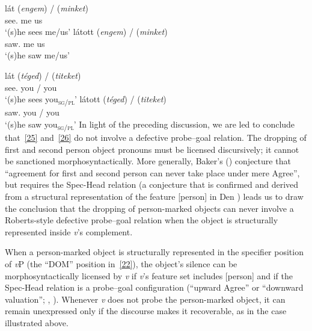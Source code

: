\documentclass[output=paper]{langsci/langscibook}
\begin{document}
\begin{refcontext}
\ea \label{25}
    \ea \gll lát (\emph{engem}) / (\emph{minket})\\
    see.\Indef{} \phantom{(}me {} \phantom{(}us\\
    \glt \enquote*{(s)he sees me/us}
    \ex \gll látott (\emph{engem}) / (\emph{minket})\\
    saw.\Indef{} \phantom{(}me {} \phantom{(}us\\
    \glt \enquote*{(s)he saw me/us}
    \z
\z

\ea \label{26}
    \ea \gll lát (\emph{téged}) / (\emph{titeket})\\
    see.\Indef{} \phantom{(}you\textsubscript{\Sg{}} / \phantom{(}you\textsubscript{\Pl}\\
    \glt \enquote*{(s)he sees you\textsubscript{\textsc{sg/pl}}}
    \ex \gll látott (\emph{téged}) / (\emph{titeket})\\
    saw.\Indef{} \phantom{(}you\textsubscript{\Sg{}} / \phantom{(}you\textsubscript{\Pl}\\
    \glt \enquote*{(s)he saw you\textsubscript{\textsc{sg/pl}}}
    \z
\z
In light of the preceding discussion, we are led to conclude that~\eqref{25}
and~\eqref{26} do not involve a defective probe--goal relation. The dropping of
first and second person object pronouns must be licensed discursively; it
cannot be sanctioned morphosyntactically. More generally, Baker's
(\citeyear[877, fn.\ 3]{baker11}) conjecture that \enquote{agreement for first and
second person can never take place under mere Agree}, but requires the
Spec-Head relation (a conjecture that is confirmed and derived from a
structural representation of the feature [person] in Den
\citealt{dikkengetegratalk}) leads us to draw the conclusion that the dropping
of person-marked objects can never involve a Roberts-style defective probe--goal
relation when the object is structurally represented inside \emph{v}'s
complement.

When a person-marked object is structurally represented in the specifier
position of \emph{v}P (the \enquote{DOM} position in~\eqref{22}), the object's
silence can be morphosyntactically licensed by \emph{v} if \emph{v}'s feature
set includes [person] and if the Spec-Head relation is a probe--goal
configuration (\enquote{upward Agree} or \enquote{downward valuation};
\citealt{BjoZei2019}, \citealt{premingerpolinsky}). Whenever \emph{v} does not
probe the person-marked object, it can remain unexpressed only if the discourse
makes it recoverable, as in the  case illustrated above.


\end{refcontext}
\end{document}
